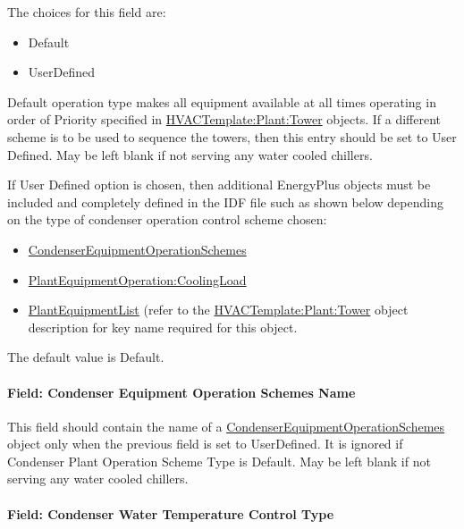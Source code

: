 The choices for this field are:

\begin{itemize}
\item
  Default
\item
  UserDefined
\end{itemize}

Default operation type makes all equipment available at all times operating in order of Priority specified in \hyperref[hvactemplateplanttower]{HVACTemplate:Plant:Tower} objects. If a different scheme is to be used to sequence the towers, then this entry should be set to User Defined. May be left blank if not serving any water cooled chillers.

If User Defined option is chosen, then additional EnergyPlus objects must be included and completely defined in the IDF file such as shown below depending on the type of condenser operation control scheme chosen:

\begin{itemize}
\item
  \hyperref[condenserequipmentoperationschemes]{CondenserEquipmentOperationSchemes}
\item
  \hyperref[plantequipmentoperationcoolingload]{PlantEquipmentOperation:CoolingLoad}
\item
  \hyperref[plantequipmentlist]{PlantEquipmentList} (refer to the \hyperref[hvactemplateplanttower]{HVACTemplate:Plant:Tower} object description for key name required for this object.
\end{itemize}

The default value is Default.

\paragraph{Field: Condenser Equipment Operation Schemes Name}\label{field-condenser-equipment-operation-schemes-name}

This field should contain the name of a \hyperref[condenserequipmentoperationschemes]{CondenserEquipmentOperationSchemes} object only when the previous field is set to UserDefined. It is ignored if Condenser Plant Operation Scheme Type is Default. May be left blank if not serving any water cooled chillers.

\paragraph{Field: Condenser Water Temperature Control Type}\label{field-condenser-water-temperature-control-type}

